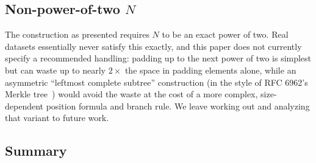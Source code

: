\subsection{Non-power-of-two $N$}
\label{sec:non-power-of-two}

The construction as presented requires $N$ to be an exact power of two.
Real datasets essentially never satisfy this exactly, and this paper does
not currently specify a recommended handling: padding up to the next power
of two is simplest but can waste up to nearly $2\times$ the space in
padding elements alone, while an asymmetric ``leftmost complete subtree''
construction (in the style of RFC 6962's Merkle
tree~\citep{rfc6962}) would avoid the
waste at the cost of a more complex, size-dependent position formula and
branch rule. We leave working out and analyzing that variant to future
work.

\subsection{Summary}

